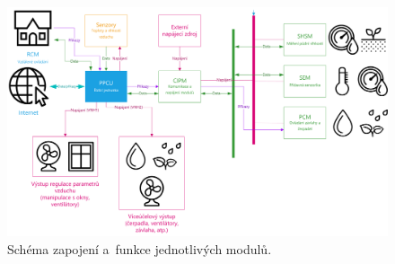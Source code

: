 \begin{figure}[htbp]
    \centering
    \includegraphics[angle=90,origin=c,scale=0.7]{img/HARDWARE/MODULES.png}
    \caption{Schéma zapojení a~funkce jednotlivých modulů.}
    \label{fig:add-MODULES}
 \end{figure}

